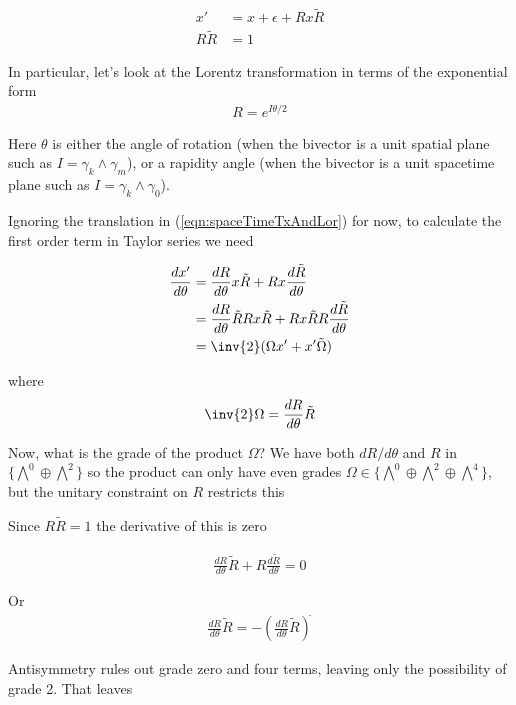 \begin{align}\label{eqn:spaceTimeTxAndLor}
x' &= x + \epsilon + R x \tilde{R} \\
R \tilde{R} &= 1
\end{align}

In particular, let's look at the Lorentz transformation in terms of the exponential form
\begin{align*}
R = e^{I \theta/2}
\end{align*}

Here $\theta$ is either the angle of rotation (when the bivector is a unit spatial plane such as $I = \gamma_k \wedge \gamma_m$), or a rapidity angle (when the bivector is a unit spacetime plane such as $I = \gamma_k \wedge \gamma_0$).

Ignoring the translation in (\ref{eqn:spaceTimeTxAndLor}) for now, to calculate the first order term in Taylor series we need

\begin{align*}
\frac{dx'}{d\theta} 
&= 
\frac{dR}{d\theta}  x \tilde{R} 
+
{R} x \frac{d\tilde{R}}{d\theta}  
\\
&= 
\frac{dR}{d\theta} \tilde{R} R x \tilde{R} 
+
{R} x \tilde{R} R \frac{d\tilde{R}}{d\theta}  
\\
&=
\inv{2} ( \Omega x' + x' \tilde{\Omega} ) \\
\end{align*}

where 
\begin{align*}
\inv{2}\Omega = \frac{dR}{d\theta} \tilde{R} 
\end{align*}

Now, what is the grade of the product $\Omega$?  We have both $dR/d\theta$ and $R$ in $\{\bigwedge^0 \oplus \bigwedge^2\}$ so the product can only have even grades $\Omega \in \{\bigwedge^0 \oplus \bigwedge^2 \oplus \bigwedge^4\}$, but the unitary constraint on $R$ restricts this

Since $R \tilde{R} = 1$ the derivative of this is zero

\begin{align*}
\frac{dR}{d\theta} \tilde{R} + {R} \frac{d\tilde{R}}{d\theta}  = 0
\end{align*}

Or
\begin{align*}
\frac{dR}{d\theta} \tilde{R} = - \left( \frac{dR}{d\theta} \tilde{R} \right)^{\tilde{}}
\end{align*}

Antisymmetry rules out grade zero and four terms, leaving only the possibility of grade 2.  That leaves

